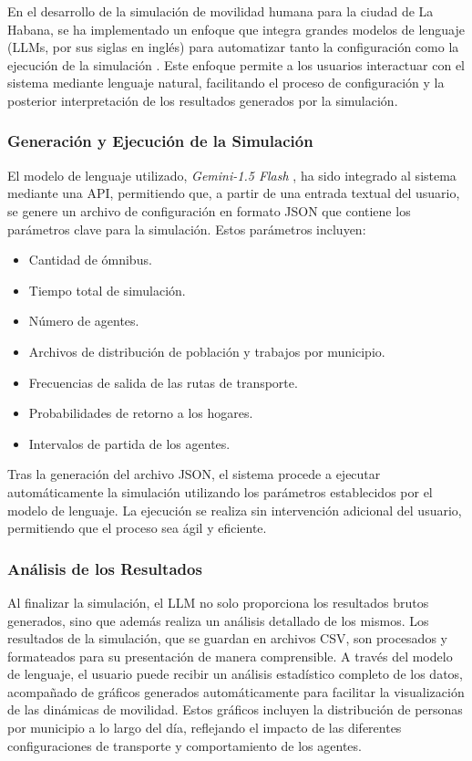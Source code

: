 \documentclass[a4paper,12pt]{article}
\begin{document}
En el desarrollo de la simulación de movilidad humana para la ciudad de La Habana, se ha implementado un enfoque que integra grandes modelos de lenguaje (LLMs, por sus siglas en inglés) para automatizar tanto la configuración como la ejecución de la simulación \cite{llm_overview}. Este enfoque permite a los usuarios interactuar con el sistema mediante lenguaje natural, facilitando el proceso de configuración y la posterior interpretación de los resultados generados por la simulación.

\subsubsection{Generación y Ejecución de la Simulación}

El modelo de lenguaje utilizado, \textit{Gemini-1.5 Flash} \cite{gemini_model}, ha sido integrado al sistema mediante una API, permitiendo que, a partir de una entrada textual del usuario, se genere un archivo de configuración en formato JSON que contiene los parámetros clave para la simulación. Estos parámetros incluyen:

\begin{itemize}
    \item Cantidad de ómnibus.
    \item Tiempo total de simulación.
    \item Número de agentes.
    \item Archivos de distribución de población y trabajos por municipio.
    \item Frecuencias de salida de las rutas de transporte.
    \item Probabilidades de retorno a los hogares.
    \item Intervalos de partida de los agentes.
\end{itemize}

Tras la generación del archivo JSON, el sistema procede a ejecutar automáticamente la simulación utilizando los parámetros establecidos por el modelo de lenguaje. La ejecución se realiza sin intervención adicional del usuario, permitiendo que el proceso sea ágil y eficiente.

\subsubsection{Análisis de los Resultados}

Al finalizar la simulación, el LLM no solo proporciona los resultados brutos generados, sino que además realiza un análisis detallado de los mismos. Los resultados de la simulación, que se guardan en archivos CSV, son procesados y formateados para su presentación de manera comprensible. A través del modelo de lenguaje, el usuario puede recibir un análisis estadístico completo de los datos, acompañado de gráficos generados automáticamente para facilitar la visualización de las dinámicas de movilidad. Estos gráficos incluyen la distribución de personas por municipio a lo largo del día, reflejando el impacto de las diferentes configuraciones de transporte y comportamiento de los agentes.
\end{document}
